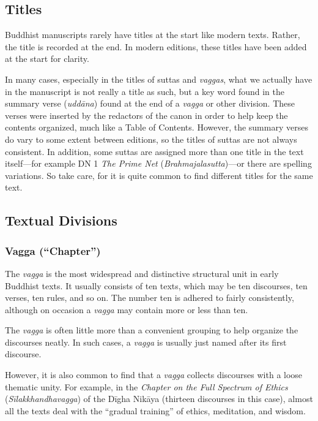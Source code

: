 \documentclass[12pt,openany]{book}%
\begin{document}
\subsection*{Titles}

Buddhist manuscripts rarely have titles at the start like modern texts. Rather, the title is recorded at the end. In modern editions, these titles have been added at the start for clarity.

In many cases, especially in the titles of suttas and \textit{vaggas}, what we actually have in the manuscript is not really a title as such, but a key word found in the summary verse (\textit{\textsanskrit{uddāna}}) found at the end of a \textit{vagga} or other division. These verses were inserted by the redactors of the canon in order to help keep the contents organized, much like a Table of Contents. However, the summary verses do vary to some extent between editions, so the titles of suttas are not always consistent. In addition, some suttas are assigned more than one title in the text itself—for example DN 1 \textit{The Prime Net} (\textit{Brahmajalasutta})—or there are spelling variations. So take care, for it is quite common to find different titles for the same text.

\subsection*{Textual Divisions}

\subsubsection*{Vagga (“Chapter”)}

The \textit{vagga} is the most widespread and distinctive structural unit in early Buddhist texts. It usually consists of ten texts, which may be ten discourses, ten verses, ten rules, and so on. The number ten is adhered to fairly consistently, although on occasion a \textit{vagga} may contain more or less than ten.

The \textit{vagga} is often little more than a convenient grouping to help organize the discourses neatly. In such cases, a \textit{vagga} is usually just named after its first discourse.

However, it is also common to find that a \textit{vagga} collects discourses with a loose thematic unity. For example, in the \textit{Chapter on the Full Spectrum of Ethics} (\textit{\textsanskrit{Sīlakkhandhavagga}}) of the \textsanskrit{Dīgha} \textsanskrit{Nikāya} (thirteen discourses in this case), almost all the texts deal with the “gradual training” of ethics, meditation, and wisdom.
\end{document}
